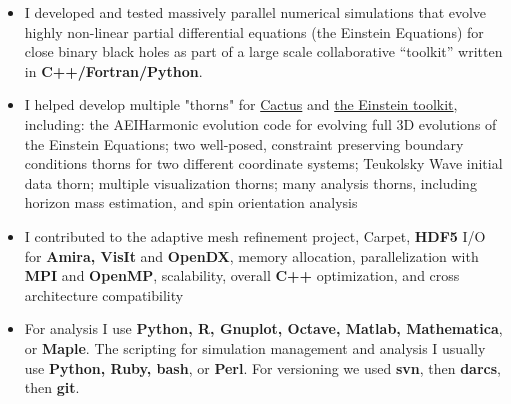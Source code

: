 \documentclass[]{seiler-resume}
\begin{document}
\begin{entrylist}
{\begin{itemize}[noitemsep, leftmargin=0.15in, parsep=0pt, partopsep=0pt]
	\item I developed and tested massively parallel numerical simulations that evolve highly non-linear partial differential equations (the Einstein Equations) for close binary black holes as part of a large scale collaborative ``toolkit'' written in {\bf C++/Fortran/Python}.
	\item I helped develop multiple "thorns" for \href{http://cactuscode.org}{Cactus} and \href{https://einsteintoolkit.org/members.html}{the Einstein toolkit}, including: the AEIHarmonic evolution code for evolving full 3D evolutions of the Einstein Equations; two well-posed, constraint preserving boundary conditions thorns for two different coordinate systems; Teukolsky Wave initial data thorn; multiple visualization thorns; many analysis thorns, including horizon mass estimation, and spin orientation analysis
	\item I contributed to the adaptive mesh refinement project, Carpet, {\bf HDF5} I/O for  {\bf Amira, VisIt} and {\bf OpenDX}, memory allocation, parallelization with {\bf MPI} and {\bf OpenMP}, scalability, overall {\bf C++} optimization, and cross architecture compatibility
	\item  For analysis I use {\bf Python, R, Gnuplot, Octave, Matlab, Mathematica}, or {\bf Maple}. The scripting for simulation management and analysis I usually use {\bf Python, Ruby, bash}, or {\bf Perl}. For versioning we used {\bf svn}, then {\bf darcs}, then {\bf git}.
\end{itemize}}

\end{entrylist}\pagebreak
\end{document}
